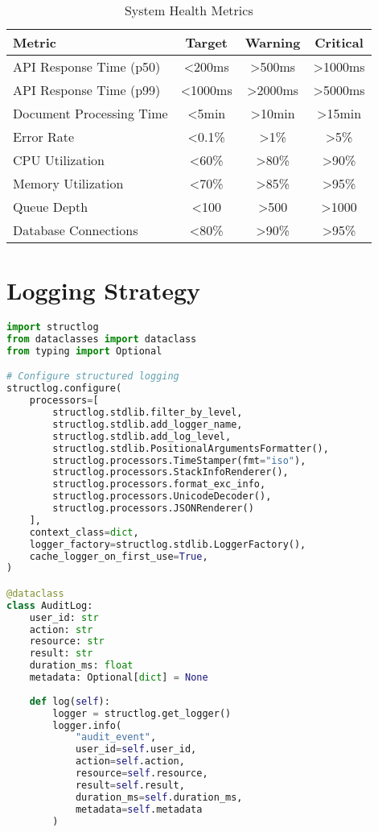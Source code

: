 \documentclass[12pt,a4paper]{report}
\begin{document}
\begin{table}[H]
\centering
\begin{tabularx}{\textwidth}{|X|c|c|c|}
\hline
\textbf{Metric} & \textbf{Target} & \textbf{Warning} & \textbf{Critical} \\
\hline
API Response Time (p50) & <200ms & >500ms & >1000ms \\
API Response Time (p99) & <1000ms & >2000ms & >5000ms \\
Document Processing Time & <5min & >10min & >15min \\
Error Rate & <0.1\% & >1\% & >5\% \\
CPU Utilization & <60\% & >80\% & >90\% \\
Memory Utilization & <70\% & >85\% & >95\% \\
Queue Depth & <100 & >500 & >1000 \\
Database Connections & <80\% & >90\% & >95\% \\
\hline
\end{tabularx}
\caption{System Health Metrics}
\end{table}

\section{Logging Strategy}

\begin{lstlisting}[language=Python, caption=Structured Logging Implementation]
import structlog
from dataclasses import dataclass
from typing import Optional

# Configure structured logging
structlog.configure(
    processors=[
        structlog.stdlib.filter_by_level,
        structlog.stdlib.add_logger_name,
        structlog.stdlib.add_log_level,
        structlog.stdlib.PositionalArgumentsFormatter(),
        structlog.processors.TimeStamper(fmt="iso"),
        structlog.processors.StackInfoRenderer(),
        structlog.processors.format_exc_info,
        structlog.processors.UnicodeDecoder(),
        structlog.processors.JSONRenderer()
    ],
    context_class=dict,
    logger_factory=structlog.stdlib.LoggerFactory(),
    cache_logger_on_first_use=True,
)

@dataclass
class AuditLog:
    user_id: str
    action: str
    resource: str
    result: str
    duration_ms: float
    metadata: Optional[dict] = None
    
    def log(self):
        logger = structlog.get_logger()
        logger.info(
            "audit_event",
            user_id=self.user_id,
            action=self.action,
            resource=self.resource,
            result=self.result,
            duration_ms=self.duration_ms,
            metadata=self.metadata
        )
\end{lstlisting}
\end{document}
